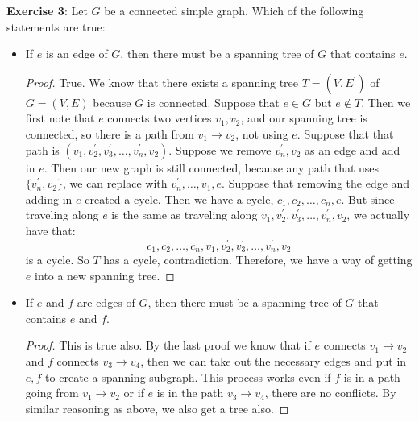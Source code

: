 \documentclass{article}
\begin{document}
\textbf{Exercise 3}: Let $G$ be a connected simple graph. Which of the following statements are true:
    \begin{itemize}
        \item If $e$ is an edge of $G$, then there must be a spanning tree of $G$ that contains $e$.
            \begin{proof}
                True. We know that there exists a spanning tree $T = (V, E^{\prime})$ of $G = (V, E)$ because $G$ is connected. Suppose that $e \in G$ but $e \notin T$. Then we first note that $e$ connects two vertices $v_{1}, v_{2}$, and our spanning tree is connected, so there is a path from $v_{1} \rightarrow v_{2}$, not using $e$. Suppose that that path is $(v_{1}, v_{2}^{\prime}, v_{3}^{\prime}, \ldots, v_{n}^{\prime}, v_{2})$. Suppose we remove $v_{n}^{\prime}, v_{2}$ as an edge and add in $e$. Then our new graph is still connected, because any path that uses $\{v_{n}^{\prime}, v_{2}\}$, we can replace with $v_{n}^{\prime}, \ldots, v_{1}, e$. Suppose that removing the edge and adding in $e$ created a cycle. Then we have a cycle, $c_{1}, c_{2}, \ldots, c_{n}, e$. But since traveling along $e$ is the same as traveling along $v_{1}, v_{2}^{\prime}, v_{3}^{\prime}, \ldots, v_{n}^{\prime}, v_{2}$, we actually have that:
                    \begin{equation*}
                        c_{1}, c_{2}, \ldots, c_{n}, v_{1}, v_{2}^{\prime}, v_{3}^{\prime}, \ldots, v_{n}^{\prime}, v_{2}
                    \end{equation*}
                is a cycle. So $T$ has a cycle, contradiction. Therefore, we have a way of getting $e$ into a new spanning tree.
            \end{proof}

        \item If $e$ and $f$ are edges of $G$, then there must be a spanning tree of $G$ that contains $e$ and $f$.
            \begin{proof}
                This is true also. By the last proof we know that if $e$ connects $v_{1} \rightarrow v_{2}$ and $f$ connects $v_{3} \rightarrow v_{4}$, then we can take out the necessary edges and put in $e, f$ to create a spanning subgraph. This process works even if $f$ is in a path going from $v_{1} \rightarrow v_{2}$ or if $e$ is in the path $v_{3}\rightarrow v_{4}$, there are no conflicts. By similar reasoning as above, we also get a tree also.
            \end{proof}


\end{itemize}
\end{document}
